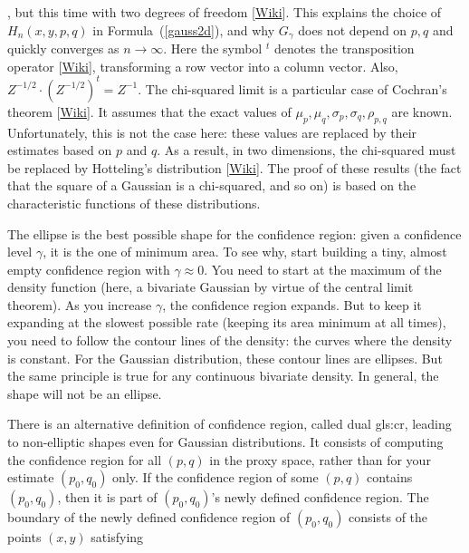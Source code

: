 \documentclass[10pt]{article}
\begin{document}
\begin{Exercise}
, but this time with two
\textcolor{index}{degrees of freedom} [\href{https://en.wikipedia.org/wiki/Degrees_of_freedom_(statistics)}{Wiki}]. This explains the choice of $H_n(x,y,p,q)$ in Formula~(\ref{gauss2d}), and why $G_\gamma$ does not depend on $p, q$ and quickly converges as $n\rightarrow\infty$.
Here the symbol $^t$ denotes the transposition operator [\href{https://en.wikipedia.org/wiki/Transpose}{Wiki}], transforming a row vector into a column vector. Also, $Z^{-1/2} \cdot (Z^{-1/2})^t=Z^{-1}$. The chi-squared limit
is a particular case of
\textcolor{index}{Cochran's theorem} [\href{https://bit.ly/3JzreHS}{Wiki}]. It assumes that the exact values of $\mu_p,\mu_q,\sigma_p,\sigma_q,\rho_{p,q}$ are known. Unfortunately,
 this is not the case here: these values are replaced by their estimates based on $p$ and $q$. As a result, in two dimensions, the chi-squared must be replaced
by
\textcolor{index}{Hotteling's distribution} [\href{https://bit.ly/3uQ4a3t}{Wiki}].  The proof of these results (the fact that the square of a Gaussian is a chi-squared, and so on)
is based on the \textcolor{index}{characteristic functions} of these distributions.

The ellipse is the best possible shape for the confidence region: given a confidence level $\gamma$, it is the one of minimum area. To see why, start building a tiny, almost empty confidence region with $\gamma\approx 0$. You need to start at the maximum of the density function (here, a bivariate Gaussian by virtue of the central limit theorem). As you increase $\gamma$, the confidence region expands. But to keep it expanding at the slowest possible rate (keeping its area minimum at all times), you need to follow the contour lines of the density: the curves where the density is constant. For the Gaussian distribution, these contour lines are ellipses. But the same principle is true for any continuous bivariate density. In general, the shape will  not be an ellipse.

There is an alternative definition of confidence region,
called \textcolor{index}{dual} \gls{gls:cr},
leading to non-elliptic shapes even for Gaussian distributions. It consists of computing the confidence region for all $(p,q)$ in the proxy space,
rather than for your estimate $(p_0,q_0)$ only. If the confidence region of some $(p,q)$ contains $(p_0,q_0)$, then it is part of $(p_0,q_0)$'s newly defined confidence region. The boundary of the newly defined confidence region of $(p_0,q_0)$ consists of the points $(x,y)$ satisfying


\end{Exercise}
\end{document}

